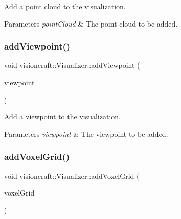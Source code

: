 Add a point cloud to the visualization. 


\begin{DoxyParams}{Parameters}
{\em point\+Cloud} & The point cloud to be added. \\
\hline
\end{DoxyParams}
\mbox{\label{classvisioncraft_1_1Visualizer_aa5fd7bbbb5ffb77dd69c171faaab6888}} 
\subsubsection{\texorpdfstring{add\+Viewpoint()}{addViewpoint()}}
{\footnotesize\ttfamily void visioncraft\+::\+Visualizer\+::add\+Viewpoint (\begin{DoxyParamCaption}\item[{const \hyperlink{classvisioncraft_1_1Viewpoint}{Viewpoint} \&}]{viewpoint }\end{DoxyParamCaption})}



Add a viewpoint to the visualization. 


\begin{DoxyParams}{Parameters}
{\em viewpoint} & The viewpoint to be added. \\
\hline
\end{DoxyParams}
\mbox{\label{classvisioncraft_1_1Visualizer_ac5b2f4098c87ecad3bb14f47a8a9d6b9}} 
\subsubsection{\texorpdfstring{add\+Voxel\+Grid()}{addVoxelGrid()}}
{\footnotesize\ttfamily void visioncraft\+::\+Visualizer\+::add\+Voxel\+Grid (\begin{DoxyParamCaption}\item[{const std\+::shared\+\_\+ptr$<$ open3d\+::geometry\+::\+Voxel\+Grid $>$ \&}]{voxel\+Grid }\end{DoxyParamCaption})}



